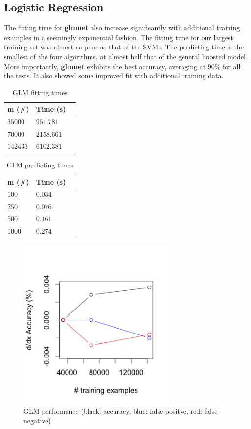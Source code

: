 \documentclass[twoside]{article}
\begin{document}
\begin{multicols}{2}
\subsection{Logistic Regression}
The fitting time for \textbf{glmnet} also increase significantly with additional training examples in a seemingly exponential fashion. The fitting time for our largest training set was almost as poor as that of the SVMs. The predicting time is the smallest of the four algorithms, at almost half that of the general boosted model. More importantly, \textbf{glmnet} exhibits the best accuracy, averaging at 90\% for all the tests. It also showed some improved fit with additional training data.

\begin{table}[H]
\caption{GLM fitting times}
\centering
\begin{tabular}{llr}
\toprule
m (\#) & Time (s) \\
\midrule
$35000$ & $951.781$ \\
$70000$ & $2158.661$ \\
$142433$ & $6102.381$ \\
\bottomrule
\end{tabular}
\end{table}

\begin{table}[H]
\caption{GLM predicting times}
\centering
\begin{tabular}{llr}
\toprule
m (\#) & Time (s) \\
\midrule
$100$ & $0.034$ \\
$250$ & $0.076$ \\
$500$ & $0.161$ \\
$1000$ & $0.274$ \\
\bottomrule
\end{tabular}
\end{table}

\begin{figure}[H]
 \caption{GLM performance (black: accuracy, blue: false-positve, red: false-negative)}
  \centering
    \includegraphics[width=8cm]{../data/glm_acc}
\end{figure}


\end{multicols}
\end{document}
